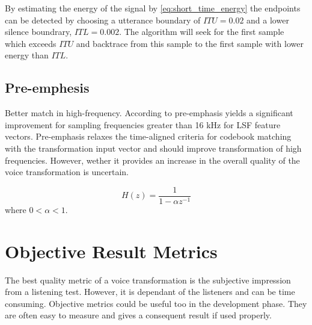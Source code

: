 By estimating the energy of the signal by \eqref{eq:short_time_energy} the endpoints can be detected by choosing a utterance boundary of \eg $ITU=0.02$ and a lower silence boundrary, \eg $ITL=0.002$. The algorithm will seek for the first sample which exceeds $ITU$ and backtrace from this sample to the first sample with lower energy than $ITL$.



\subsection{Pre-emphesis} %
\label{sub:pre_emphesis}
Better match in high-frequency. According to \cite{turk06} pre-emphasis yields a significant improvement for sampling frequencies greater than 16 kHz for LSF feature vectors. Pre-emphasis relaxes the time-aligned criteria for codebook matching with the transformation input vector and should improve transformation of high frequencies. However, wether it provides an increase in the overall quality of the voice transformation is uncertain.

\begin{equation}
	H(z) = \frac{1}{1-\alpha z^{-1}}
\end{equation}
where $0<\alpha < 1$.

\section{Objective Result Metrics} %
\label{sec:objective_metrics}
The best quality metric of a voice transformation is the subjective impression from a listening test. However, it is dependant of the listeners and can be time consuming. Objective metrics could be useful too in the development phase. They are often easy to measure and gives a consequent result if used properly. 

